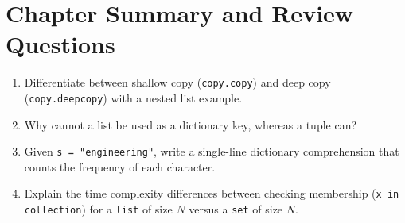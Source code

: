 \section{Chapter Summary and Review Questions}
\begin{enumerate}[leftmargin=1.8em, itemsep=4pt]
    \item Differentiate between shallow copy (\texttt{copy.copy}) and deep copy (\texttt{copy.deepcopy}) with a nested list example.
    \item Why cannot a list be used as a dictionary key, whereas a tuple can?
    \item Given \texttt{s = "engineering"}, write a single-line dictionary comprehension that counts the frequency of each character.
    \item Explain the time complexity differences between checking membership (\texttt{x in collection}) for a \texttt{list} of size $N$ versus a \texttt{set} of size $N$.
\end{enumerate}
